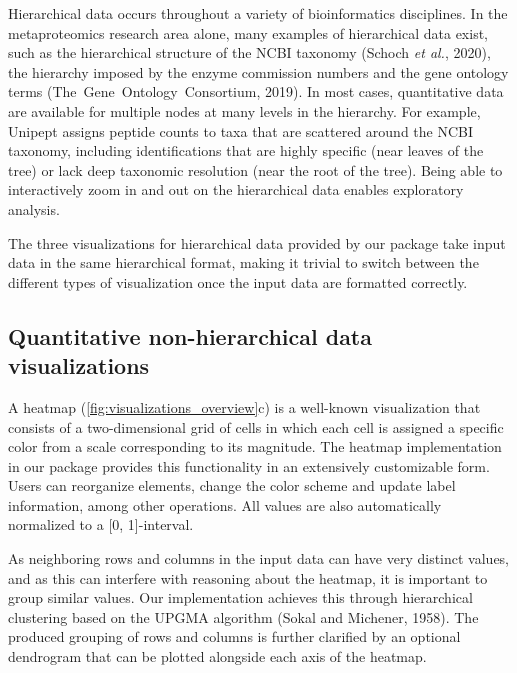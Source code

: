 Hierarchical data occurs throughout a variety of bioinformatics
disciplines. In the metaproteomics research area alone, many examples of
hierarchical data exist, such as the hierarchical structure of the NCBI
taxonomy (Schoch \emph{et al.}, 2020), the hierarchy imposed by the
enzyme commission numbers and the gene ontology terms
(The~Gene~Ontology~Consortium, 2019). In most cases, quantitative data
are available for multiple nodes at many levels in the hierarchy. For
example, Unipept assigns peptide counts to taxa that are scattered
around the NCBI taxonomy, including identifications that are highly
specific (near leaves of the tree) or lack deep taxonomic resolution
(near the root of the tree). Being able to interactively zoom in and out
on the hierarchical data enables exploratory analysis.

The three visualizations for hierarchical data provided by our package
take input data in the same hierarchical format, making it trivial to
switch between the different types of visualization once the input data
are formatted correctly.

\hypertarget{quantitative-non-hierarchical-data-visualizations}{%
\subsection{Quantitative non-hierarchical data
visualizations}\label{quantitative-non-hierarchical-data-visualizations}}

A heatmap (\autoref{fig:visualizations_overview}c) is a well-known
visualization that consists of a two-dimensional grid of cells in which
each cell is assigned a specific color from a scale corresponding to its
magnitude. The heatmap implementation in our package provides this
functionality in an extensively customizable form. Users can reorganize
elements, change the color scheme and update label information, among
other operations. All values are also automatically normalized to a
{[}0, 1{]}-interval.

As neighboring rows and columns in the input data can have very distinct
values, and as this can interfere with reasoning about the heatmap, it
is important to group similar values. Our implementation achieves this
through hierarchical clustering based on the UPGMA algorithm (Sokal and
Michener, 1958). The produced grouping of rows and columns is further
clarified by an optional dendrogram that can be plotted alongside each
axis of the heatmap.

